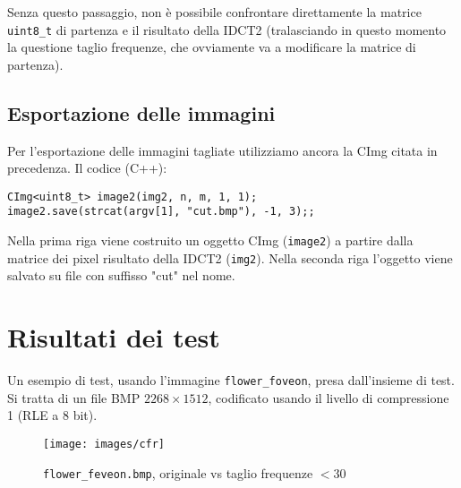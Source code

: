 \documentclass[11pt,a4paper]{scrartcl}
\begin{document}
Senza questo passaggio, non è possibile confrontare direttamente la matrice \texttt{uint8\_t} di partenza e il risultato della IDCT2 (tralasciando in questo momento la questione taglio frequenze, che ovviamente va a modificare la matrice di partenza).

\subsection*{Esportazione delle immagini}
Per l'esportazione delle immagini tagliate utilizziamo ancora la CImg citata in precedenza. Il codice (C++):
\begin{verbatim}
CImg<uint8_t> image2(img2, n, m, 1, 1);
image2.save(strcat(argv[1], "cut.bmp"), -1, 3);;
\end{verbatim}

Nella prima riga viene costruito un oggetto CImg (\texttt{image2}) a partire dalla matrice dei pixel risultato della IDCT2 (\texttt{img2}). Nella seconda riga l'oggetto viene salvato su file con suffisso "cut" nel nome.

\section*{Risultati dei test}

Un esempio di test, usando l'immagine \texttt{flower\_foveon}, presa dall'insieme di test. Si tratta di un file BMP $2268 \times 1512$, codificato usando il livello di compressione 1 (RLE a 8 bit).

\begin{figure}[!ht]
\centering
\texttt{[image: images/cfr]} 
\caption{\texttt{flower\_feveon.bmp}, originale vs taglio frequenze $< 30$}
\end{figure}
\end{document}
